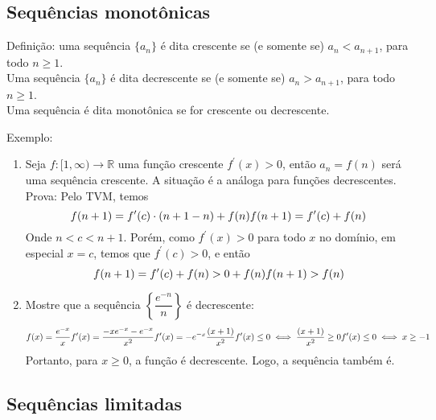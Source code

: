 \hypertarget{sequuxeancias-monotuxf4nicas}{%
\subsection{Sequências monotônicas}\label{sequuxeancias-monotuxf4nicas}}

Definição: uma sequência \(\{a_n\}\) é dita crescente se (e somente se)
\(a_n < a_{n + 1}\), para todo \(n \geq 1\).\\
Uma sequência \(\{a_n\}\) é dita decrescente se (e somente se)
\(a_n > a_{n + 1}\), para todo \(n \geq 1\).\\
Uma sequência é dita monotônica se for crescente ou decrescente.

Exemplo:

\begin{enumerate}
\def\labelenumi{\arabic{enumi}.}
\setcounter{enumi}{11}
\tightlist
\item
  Seja \(f:[1, \infty) \to \mathbb{R}\) uma função crescente
  \(f^\prime(x) > 0\), então \(a_n = f(n)\) será uma sequência
  crescente. A situação é a análoga para funções decrescentes.\\
  Prova: Pelo TVM, temos \[
  f(n + 1) = f^\prime(c) \cdot (n + 1 - n) + f(n)\\
  f(n + 1) = f^\prime(c) + f(n)
  \] Onde \(n < c < n + 1\). Porém, como \(f^\prime(x) > 0\) para todo
  \(x\) no domínio, em especial \(x = c\), temos que
  \(f^\prime(c) > 0\), e então \[
  f(n + 1) = f^\prime(c) + f(n) > 0 + f(n) \\
  f(n + 1) > f(n)
  \]
\item
  Mostre que a sequência \(\left\{ \dfrac{e^{-n}}{n} \right\}\) é
  decrescente: \[
  f(x) = \dfrac{e^{-x}}{x}\\
  f^\prime(x) = \dfrac{-xe^{-x} -e^{-x}}{x^2}\\
  f^\prime(x) = -e^{-x} \dfrac{(x + 1)}{x^2}\\
  f^\prime(x) \leq 0 \iff 
  \dfrac{(x + 1)}{x^2} \geq 0\\
  f^\prime(x) \leq 0 \iff 
  x \geq -1
  \] Portanto, para \(x \geq 0\), a função é decrescente. Logo, a
  sequência também é.
\end{enumerate}

\hypertarget{sequuxeancias-limitadas}{%
\subsection{Sequências limitadas}\label{sequuxeancias-limitadas}}


